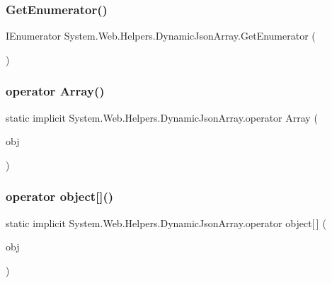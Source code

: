 \subsubsection{\texorpdfstring{Get\+Enumerator()}{GetEnumerator()}}
{\footnotesize\ttfamily I\+Enumerator System.\+Web.\+Helpers.\+Dynamic\+Json\+Array.\+Get\+Enumerator (\begin{DoxyParamCaption}{ }\end{DoxyParamCaption})}

\mbox{\label{classSystem_1_1Web_1_1Helpers_1_1DynamicJsonArray_a4f1b74ac91d5f8f3a2b95475e05c4ad7_a4f1b74ac91d5f8f3a2b95475e05c4ad7}} 
\subsubsection{\texorpdfstring{operator Array()}{operator Array()}}
{\footnotesize\ttfamily static implicit System.\+Web.\+Helpers.\+Dynamic\+Json\+Array.\+operator Array (\begin{DoxyParamCaption}\item[{\hyperlink{classSystem_1_1Web_1_1Helpers_1_1DynamicJsonArray}{Dynamic\+Json\+Array}}]{obj }\end{DoxyParamCaption})\hspace{0.3cm}{\ttfamily [static]}}

\mbox{\label{classSystem_1_1Web_1_1Helpers_1_1DynamicJsonArray_aa4bc62411aa6ec4bed9c8551a110d62a_aa4bc62411aa6ec4bed9c8551a110d62a}} 
\subsubsection{\texorpdfstring{operator object[]()}{operator object[]()}}
{\footnotesize\ttfamily static implicit System.\+Web.\+Helpers.\+Dynamic\+Json\+Array.\+operator object\mbox{[}$\,$\mbox{]} (\begin{DoxyParamCaption}\item[{\hyperlink{classSystem_1_1Web_1_1Helpers_1_1DynamicJsonArray}{Dynamic\+Json\+Array}}]{obj }\end{DoxyParamCaption})\hspace{0.3cm}{\ttfamily [static]}}

